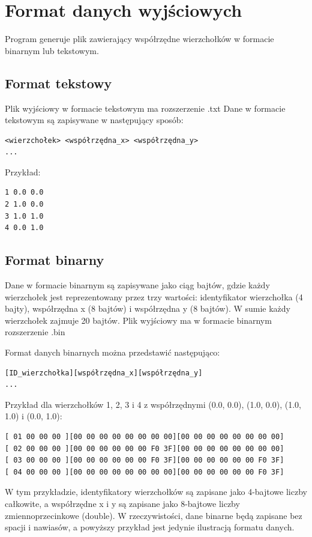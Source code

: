 \documentclass[12pt]{article}
\begin{document}
\section{Format danych wyjściowych}

Program generuje plik zawierający współrzędne wierzchołków w formacie binarnym
lub tekstowym.

\subsection{Format tekstowy}
Plik wyjściowy w formacie tekstowym ma rozszerzenie .txt
Dane w formacie tekstowym są zapisywane w następujący sposób:

\begin{verbatim}
<wierzchołek> <współrzędna_x> <współrzędna_y>
...
\end{verbatim}

Przykład:

\begin{verbatim}
1 0.0 0.0
2 1.0 0.0
3 1.0 1.0
4 0.0 1.0
\end{verbatim}

\subsection{Format binarny}

Dane w formacie binarnym są zapisywane jako ciąg bajtów, gdzie każdy
wierzchołek jest reprezentowany przez trzy wartości: identyfikator wierzchołka
(4 bajty), współrzędna x (8 bajtów) i współrzędna y (8 bajtów). W sumie każdy
wierzchołek zajmuje 20 bajtów. Plik wyjściowy ma w formacie binarnym rozszerzenie .bin

Format danych binarnych można przedstawić następująco:

\begin{verbatim}
[ID_wierzchołka][współrzędna_x][współrzędna_y]
...
\end{verbatim}

Przykład dla wierzchołków 1, 2, 3 i 4 z współrzędnymi (0.0, 0.0), (1.0, 0.0), (1.0, 1.0) i (0.0, 1.0):
\begin{verbatim}
[ 01 00 00 00 ][00 00 00 00 00 00 00 00][00 00 00 00 00 00 00 00]
[ 02 00 00 00 ][00 00 00 00 00 00 F0 3F][00 00 00 00 00 00 00 00]
[ 03 00 00 00 ][00 00 00 00 00 00 F0 3F][00 00 00 00 00 00 F0 3F]
[ 04 00 00 00 ][00 00 00 00 00 00 00 00][00 00 00 00 00 00 F0 3F]
\end{verbatim}
W tym przykładzie, identyfikatory wierzchołków są zapisane jako 4-bajtowe
liczby całkowite, a współrzędne x i y są zapisane jako 8-bajtowe liczby
zmiennoprzecinkowe (double). W rzeczywistości, dane binarne będą zapisane bez
spacji i nawiasów, a powyższy przykład jest jedynie ilustracją formatu danych.
\end{document}
